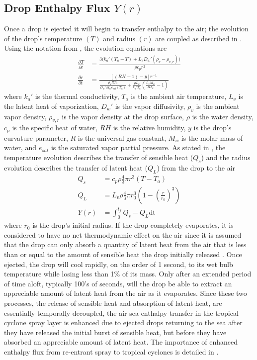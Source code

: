 \documentclass[17pt,a4paper]{article}
\begin{document}
\subsection{Drop Enthalpy Flux $Y(r)$}
Once a drop is ejected it will begin to transfer enthalpy to the air; the evolution of the drop's temperature $(T)$ and radius $(r)$ are coupled as described in \citet{Pruppacher1978}. Using the notation from \citet{Andreas2005}, the evolution equations are
\begin{align}
\frac{\partial T}{\partial t} &= \frac{3\Big(k_a'(T_a-T)+L_vD_w'(\rho_v-\rho_{v,r})\Big)}{\rho c_{p}r^2} \\
\frac{\partial r}{\partial t} &= \frac{[(RH-1)-y]r^{-1}}{\frac{\rho_sRT_a}{D_w'M_we_{\text{sat}}(T_a)}+\frac{\rho L_v}{k_a'T_a}\left(\frac{L_vM_w}{RT_a}-1\right)}
\end{align}
where $k_a'$ is the thermal conductivity, $T_a$ is the ambient air temperature, $L_v$ is the latent heat of vaporization, $D_w'$ is the vapor diffusivity, $\rho_v$ is the ambient vapor density, $\rho_{v,r}$ is the vapor density at the drop surface, $\rho$ is the water density, $c_p$ is the specific heat of water, $RH$ is the relative humidity, $y$ is the drop's curvature parameter, $R$ is the universal gas constant, $M_w$ is the molar mass of water, and $e_{sat}$ is the saturated vapor partial pressure. As stated in \citet{Andreas1992}, the temperature evolution describes the transfer of sensible heat ($Q_s$) and the radius evolution describes the transfer of latent heat ($Q_L$) from the drop to the air 
\begin{align}
Q_s &= c_p \rho \frac{4}{3}\pi r^3(T - T_a)\\
Q_L &= L_v  \rho \frac{4}{3}\pi r_0^3\left(1-\left(\frac{r}{r_0}\right)^3\right)\\
Y(r) &= \int_0^{t_f} Q_s - Q_L \text{dt}
\end{align}
 where $r_0$ is the drop's initial radius. If the drop completely evaporates, it is considered to have no net thermodynamic effect on the air since it is assumed that the drop can only absorb a quantity of latent heat from the air that is less than or equal to the amount of sensible heat the drop initially released \citep{Pruppacher1978}.
Once ejected, the drop will cool rapidly, on the order of 1 second, to its wet bulb temperature while losing less than 1\% of its mass. Only after an extended period of time aloft, typically 100's of seconds, will the drop be able to extract an appreciable amount of latent heat from the air as it evaporates. Since these two processes, the release of sensible heat and absorption of latent heat, are essentially temporally decoupled, the air-sea enthalpy transfer in the tropical cyclone spray layer is enhanced due to ejected drops returning to the sea after they have released the initial burst of sensible heat, but before they have absorbed an appreciable amount of latent heat. The importance of enhanced enthalpy flux from re-entrant spray to tropical cyclones is detailed in \citet{Andreas2001}.\par
\end{document}
